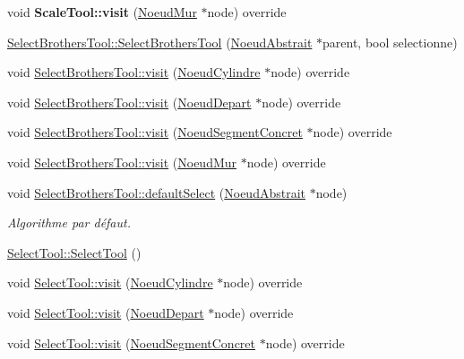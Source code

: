 \begin{DoxyCompactItemize}
\item 
\hypertarget{group__inf2990_ga376afcceadc7462902ff0e3bad3573e9}{void {\bfseries Scale\-Tool\-::visit} (\hyperlink{class_noeud_mur}{Noeud\-Mur} $\ast$node) override}\label{group__inf2990_ga376afcceadc7462902ff0e3bad3573e9}

\item 
\hyperlink{group__inf2990_gaa7c8bdba711edc6d4817c02c19f3dbe0}{Select\-Brothers\-Tool\-::\-Select\-Brothers\-Tool} (\hyperlink{class_noeud_abstrait}{Noeud\-Abstrait} $\ast$parent, bool selectionne)
\item 
void \hyperlink{group__inf2990_ga107677b2987385a2604f9c3ec11670b6}{Select\-Brothers\-Tool\-::visit} (\hyperlink{class_noeud_cylindre}{Noeud\-Cylindre} $\ast$node) override
\item 
void \hyperlink{group__inf2990_gac19bea128f3c4fb5084a44c761482ec9}{Select\-Brothers\-Tool\-::visit} (\hyperlink{class_noeud_depart}{Noeud\-Depart} $\ast$node) override
\item 
void \hyperlink{group__inf2990_gaf85983eda4fdee6755880c48d5acef1e}{Select\-Brothers\-Tool\-::visit} (\hyperlink{class_noeud_segment_concret}{Noeud\-Segment\-Concret} $\ast$node) override
\item 
void \hyperlink{group__inf2990_gaa9bd4b29b9f7865ac1903de6b6e5a0ca}{Select\-Brothers\-Tool\-::visit} (\hyperlink{class_noeud_mur}{Noeud\-Mur} $\ast$node) override
\item 
void \hyperlink{group__inf2990_ga53a73bc192206845143b838a267a7a3e}{Select\-Brothers\-Tool\-::default\-Select} (\hyperlink{class_noeud_abstrait}{Noeud\-Abstrait} $\ast$node)
\begin{DoxyCompactList}\small\item\em Algorithme par défaut. \end{DoxyCompactList}\item 
\hyperlink{group__inf2990_ga2174af55e744036f0ccc5ce1fe25ddb1}{Select\-Tool\-::\-Select\-Tool} ()
\item 
void \hyperlink{group__inf2990_gacd9fee116b738725ab0f664029253fa0}{Select\-Tool\-::visit} (\hyperlink{class_noeud_cylindre}{Noeud\-Cylindre} $\ast$node) override
\item 
void \hyperlink{group__inf2990_ga392f7eb2a74106cff675878f5453a9d3}{Select\-Tool\-::visit} (\hyperlink{class_noeud_depart}{Noeud\-Depart} $\ast$node) override
\item 
void \hyperlink{group__inf2990_ga3e4db43bef245d0d88d49f018fee424f}{Select\-Tool\-::visit} (\hyperlink{class_noeud_segment_concret}{Noeud\-Segment\-Concret} $\ast$node) override

\end{DoxyCompactItemize}
